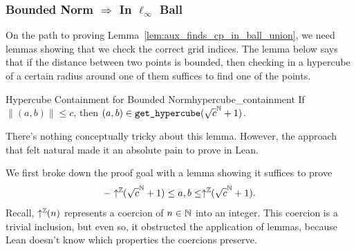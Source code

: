 \documentclass{article}
\begin{document}




\subsubsection{Bounded Norm $\Rightarrow$ In $\ell_\infty$ Ball}
On the path to proving Lemma~\ref{lem:aux_finds_cp_in_ball_union}, we need lemmas showing that we check the correct grid indices.
The lemma below says that if the distance between two points is bounded, then checking in a hypercube of a certain radius around one of them suffices to find one of the points.
\begin{tcblemma}{Hypercube Containment for Bounded Norm}{hypercube_containment}
  If $\|(a, b)\| \leq c$, then $(a, b) \in \texttt{get\_hypercube}(\sqrt{c}^{\mathbb{N}} + 1)$.
\end{tcblemma}
There's nothing conceptually tricky about this lemma.
However, the approach that felt natural made it an absolute pain to prove in Lean.

We first broke down the proof goal with a lemma showing it suffices to prove
\[ -\uparrow^{\mathbb{Z}}\!\!(\sqrt{c}^{\mathbb{N}} + 1) \leq a, b \leq \uparrow^{\mathbb{Z}}\!\!(\sqrt{c}^{\mathbb{N}} + 1). \]
Recall, $\uparrow^{\mathbb{Z}}\!\!(n)$ represents a coercion of $n \in \mathbb{N}$ into an integer.
This coercion is a trivial inclusion, but even so, it obstructed the application of lemmas, because Lean doesn't know which properties the coercions preserve.
\end{document}

